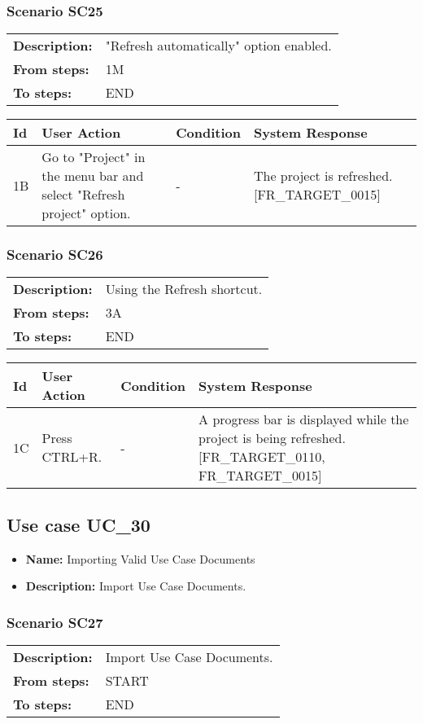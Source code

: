 \documentclass[a4paper,11pt]{article}
\newcommand{\bl}{\\ \hline}
\begin{document}
\subsubsection*{Scenario SC25}
\begin{tabular}{p{1in}p{4in}}
{\bf Description:} & "Refresh automatically" option enabled. \\
{\bf From steps:} & 1M \\
{\bf To steps:} & END \\
\end{tabular}
 
\begin{tabular}{|p{0.8in}|p{1.6in}|p{1.6in}|p{1.6in}|}
\hline
Id & User Action & Condition & System Response  \bl 
1B & Go to "Project" in the menu bar and select "Refresh
						project" option. & - & The project is refreshed. [FR_TARGET_0015] \bl 
\end{tabular}
\subsubsection*{Scenario SC26}
\begin{tabular}{p{1in}p{4in}}
{\bf Description:} & Using the Refresh shortcut. \\
{\bf From steps:} & 3A \\
{\bf To steps:} & END \\
\end{tabular}
 
\begin{tabular}{|p{0.8in}|p{1.6in}|p{1.6in}|p{1.6in}|}
\hline
Id & User Action & Condition & System Response  \bl 
1C & Press CTRL+R. & - & A progress bar is displayed while the project is being
						refreshed. [FR_TARGET_0110, FR_TARGET_0015] \bl 
\end{tabular}
\subsection*{Use case UC_30}
\begin{itemize}
\item {\bf Name: }Importing Valid Use Case Documents
\item {\bf Description: } Import Use Case Documents.
\end{itemize}
\subsubsection*{Scenario SC27}
\begin{tabular}{p{1in}p{4in}}
{\bf Description:} & Import Use Case Documents. \\
{\bf From steps:} & START \\
{\bf To steps:} & END \\
\end{tabular}
 
\end{document}
